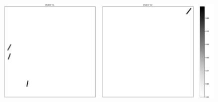 \documentclass[a4paper]{report}
\begin{document}
\begin{figure} [H]
    \centering
    \includegraphics [width=\textwidth ] {c/c/11.png}
    \caption{}
\end{figure}
\end{document}
